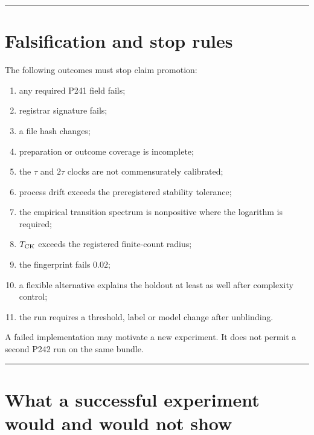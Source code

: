 \documentclass[11pt,a4paper,openany]{report}
\begin{document}
\par\medskip\hrule\medskip

\chapter{Falsification and stop rules}

The following outcomes must stop claim promotion:

\begin{enumerate}
\item 
any required P241 field fails;

\item 
registrar signature fails;

\item 
a file hash changes;

\item 
preparation or outcome coverage is incomplete;

\item 
the \(\tau\) and \(2\tau\) clocks are not commensurately calibrated;

\item 
process drift exceeds the preregistered stability tolerance;

\item 
the empirical transition spectrum is nonpositive where the logarithm is required;

\item 
\(T_{\rm CK}\) exceeds the registered finite-count radius;

\item 
the fingerprint fails \(0.02\);

\item 
a flexible alternative explains the holdout at least as well after complexity control;

\item 
the run requires a threshold, label or model change after unblinding.

\end{enumerate}

A failed implementation may motivate a new experiment. It does not permit a second P242 run on the same bundle.

\par\medskip\hrule\medskip

\chapter{What a successful experiment would and would not show}
\end{document}
